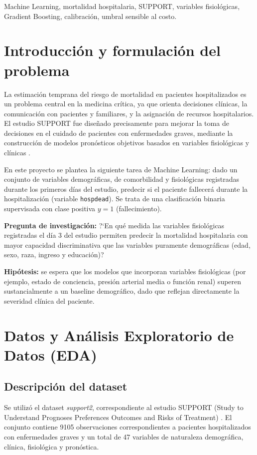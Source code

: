 \documentclass[conference]{IEEEtran}
\begin{document}
\begin{IEEEkeywords}
Machine Learning, mortalidad hospitalaria, SUPPORT, variables fisiológicas, Gradient Boosting, calibración, umbral sensible al costo.
\end{IEEEkeywords}

\section{Introducción y formulación del problema}
La estimación temprana del riesgo de mortalidad en pacientes hospitalizados es un problema central en la medicina crítica, ya que orienta decisiones clínicas, la comunicación con pacientes y familiares, y la asignación de recursos hospitalarios. El estudio SUPPORT fue diseñado precisamente para mejorar la toma de decisiones en el cuidado de pacientes con enfermedades graves, mediante la construcción de modelos pronósticos objetivos basados en variables fisiológicas y clínicas \cite{knaus1995}.

En este proyecto se plantea la siguiente tarea de Machine Learning: dado un conjunto de variables demográficas, de comorbilidad y fisiológicas registradas durante los primeros días del estudio, predecir si el paciente fallecerá durante la hospitalización (variable \texttt{hospdead}). Se trata de una clasificación binaria supervisada con clase positiva $y=1$ (fallecimiento).

\textbf{Pregunta de investigación:} ?`En qué medida las variables fisiológicas registradas el día 3 del estudio permiten predecir la mortalidad hospitalaria con mayor capacidad discriminativa que las variables puramente demográficas (edad, sexo, raza, ingreso y educación)?

\textbf{Hipótesis:} se espera que los modelos que incorporan variables fisiológicas (por ejemplo, estado de conciencia, presión arterial media o función renal) superen sustancialmente a un baseline demográfico, dado que reflejan directamente la severidad clínica del paciente.

\section{Datos y Análisis Exploratorio de Datos (EDA)}

\subsection{Descripción del dataset}
Se utilizó el dataset \textit{support2}, correspondiente al estudio SUPPORT (Study to Understand Prognoses Preferences Outcomes and Risks of Treatment) \cite{supportdata}. El conjunto contiene 9105 observaciones correspondientes a pacientes hospitalizados con enfermedades graves y un total de 47 variables de naturaleza demográfica, clínica, fisiológica y pronóstica.
\end{document}
